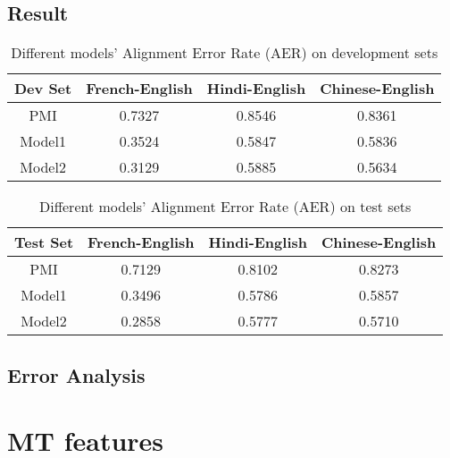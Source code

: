 \documentclass[letterpaper]{article}
\begin{document}
\subsection{Result}

\begin{table}
\begin{center}
\begin{tabular}{cccc}
\hline
\textbf{Dev Set} & French-English & Hindi-English & Chinese-English \\
\hline
PMI & 0.7327 & 0.8546 & 0.8361 \\
Model1 & 0.3524 &  0.5847 &  0.5836 \\
Model2 & 0.3129 & 0.5885 & 0.5634 \\
\hline
\end{tabular}
\caption{Different models' Alignment Error Rate (AER) on development sets}\label{tab:dev_result}
\end{center}
\end{table}

\begin{table}
\begin{center}
\begin{tabular}{cccc}
\hline
\textbf{Test Set} & French-English & Hindi-English & Chinese-English \\
\hline
PMI & 0.7129 & 0.8102 & 0.8273 \\
Model1 & 0.3496 &  0.5786 &   0.5857 \\
Model2 & 0.2858 & 0.5777 & 0.5710 \\
\hline
\end{tabular}
\caption{Different models' Alignment Error Rate (AER) on test sets}\label{tab:test_result}
\end{center}
\end{table}



\subsection{Error Analysis}

\section{MT features}
\end{document}
